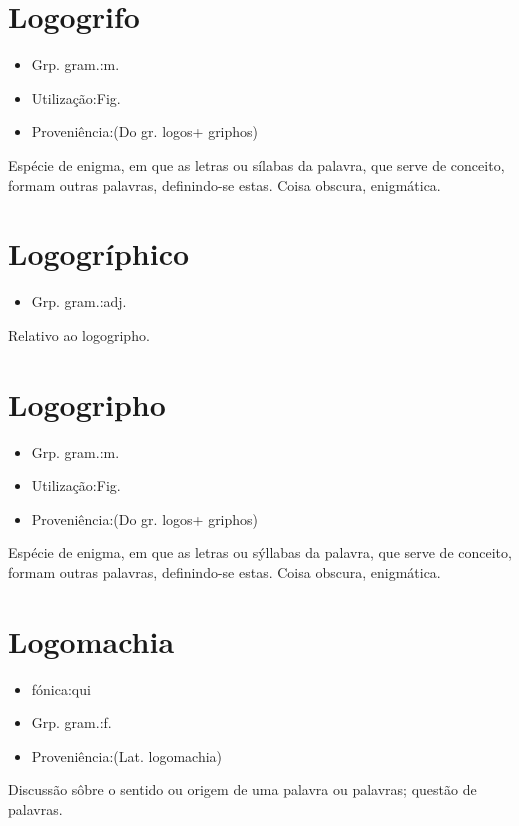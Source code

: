 \section{Logogrifo}
\begin{itemize}
\item {Grp. gram.:m.}
\end{itemize}
\begin{itemize}
\item {Utilização:Fig.}
\end{itemize}
\begin{itemize}
\item {Proveniência:(Do gr. \textunderscore logos\textunderscore  + \textunderscore griphos\textunderscore )}
\end{itemize}
Espécie de enigma, em que as letras ou sílabas da palavra, que serve de conceito, formam outras palavras, definindo-se estas.
Coisa obscura, enigmática.
\section{Logogríphico}
\begin{itemize}
\item {Grp. gram.:adj.}
\end{itemize}
Relativo ao logogripho.
\section{Logogripho}
\begin{itemize}
\item {Grp. gram.:m.}
\end{itemize}
\begin{itemize}
\item {Utilização:Fig.}
\end{itemize}
\begin{itemize}
\item {Proveniência:(Do gr. \textunderscore logos\textunderscore  + \textunderscore griphos\textunderscore )}
\end{itemize}
Espécie de enigma, em que as letras ou sýllabas da palavra, que serve de conceito, formam outras palavras, definindo-se estas.
Coisa obscura, enigmática.
\section{Logomachia}
\begin{itemize}
\item {fónica:qui}
\end{itemize}
\begin{itemize}
\item {Grp. gram.:f.}
\end{itemize}
\begin{itemize}
\item {Proveniência:(Lat. \textunderscore logomachia\textunderscore )}
\end{itemize}
Discussão sôbre o sentido ou origem de uma palavra ou palavras; questão de palavras.
